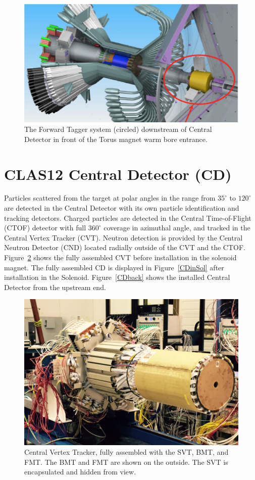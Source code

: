 \documentclass[final,3p,twocolumn]{elsarticle}
\begin{document}
\begin{figure}[htbp!]
\centerline{\includegraphics[width=1.0\columnwidth]{CD-FT.png}}
\caption{The Forward Tagger system (circled) downstream of Central Detector in front of the Torus magnet warm
bore entrance.}
\label{ft}
\end{figure}

\section{CLAS12 Central Detector (CD)} 

Particles scattered from the target at polar angles in the range from $35^\circ$  to $120^\circ$ are detected in the
Central Detector with its own particle identification and tracking detectors. Charged particles are detected in the
Central Time-of-Flight (CTOF) detector with full $360^\circ$ coverage in azimuthal angle, and tracked in the Central
Vertex Tracker (CVT). Neutron detection is provided by the Central Neutron Detector (CND) located radially outside
of the CVT and the CTOF.  Figure~\ref{CVT} shows the fully assembled CVT before installation in the solenoid magnet.
The fully assembled CD is displayed in  Figure~\ref{CDinSol} after installation in the Solenoid.  Figure~\ref{CDback}
shows the installed Central Detector from the upstream end.

\begin{figure}[htbp!]
\centerline{\includegraphics[width=1.0\columnwidth]{CVT.png}}
\caption{Central Vertex Tracker, fully assembled with the SVT, BMT, and FMT. The BMT and FMT are shown on the
outside. The SVT is encapsulated and hidden from view.}
\label{CVT}
\end{figure}
\end{document}
